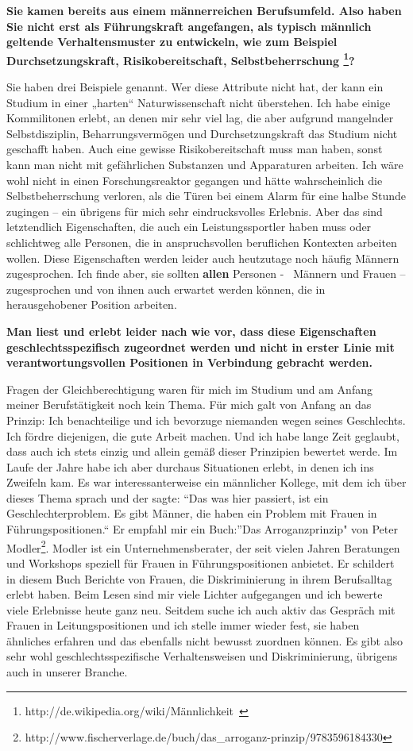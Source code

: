 \documentclass[a4paper,
fontsize=11pt,
oneside,
numbers=noperiodatend,
parskip=half-,
bibliography=totoc,
final
]{scrartcl}
\begin{document}
\textbf{Sie kamen bereits aus einem männerreichen Berufsumfeld. Also
haben Sie nicht erst als Führungskraft angefangen, als typisch männlich
geltende Verhaltensmuster zu entwickeln, wie zum Beispiel
Durchsetzungskraft, Risikobereitschaft, Selbstbeherrschung \footnote{http://de.wikipedia.org/wiki/Männlichkeit~}?~}

Sie haben drei Beispiele genannt. Wer diese Attribute nicht hat, der
kann ein Studium in einer „harten`` Naturwissenschaft nicht überstehen.
Ich habe einige Kommilitonen erlebt, an denen mir sehr viel lag, die
aber aufgrund mangelnder Selbstdisziplin, Beharrungsvermögen und
Durchsetzungskraft das Studium nicht geschafft haben. Auch eine gewisse
Risikobereitschaft muss man haben, sonst kann man nicht mit gefährlichen
Substanzen und Apparaturen arbeiten. Ich wäre wohl nicht in einen
Forschungsreaktor gegangen und hätte wahrscheinlich die
Selbstbeherrschung verloren, als die Türen bei einem Alarm für eine
halbe Stunde zugingen -- ein übrigens für mich sehr eindrucksvolles
Erlebnis. Aber das sind letztendlich Eigenschaften, die auch ein
Leistungssportler haben muss oder schlichtweg alle Personen, die in
anspruchsvollen beruflichen Kontexten arbeiten wollen. Diese
Eigenschaften werden leider auch heutzutage noch häufig Männern
zugesprochen. Ich finde aber, sie sollten \textbf{allen} Personen -~
Männern und Frauen -- zugesprochen und von ihnen auch erwartet werden
können, die in herausgehobener Position arbeiten.~

\textbf{Man liest und erlebt leider nach wie vor, dass diese
Eigenschaften geschlechtsspezifisch zugeordnet werden und nicht in
erster Linie mit verantwortungsvollen Positionen in Verbindung gebracht
werden.~}

Fragen der Gleichberechtigung waren für mich im Studium und am Anfang
meiner Berufstätigkeit noch kein Thema. Für mich galt von Anfang an das
Prinzip: Ich benachteilige und ich bevorzuge niemanden wegen seines
Geschlechts. Ich fördre diejenigen, die gute Arbeit machen. Und ich habe
lange Zeit geglaubt, dass auch ich stets einzig und allein gemäß dieser
Prinzipien bewertet werde. Im Laufe der Jahre habe ich aber durchaus
Situationen erlebt, in denen ich ins Zweifeln kam. Es war
interessanterweise ein männlicher Kollege, mit dem ich über dieses Thema
sprach und der sagte: \enquote{Das was hier passiert, ist ein
Geschlechterproblem. Es gibt Männer, die haben ein Problem mit Frauen in
Führungspositionen.`` Er empfahl mir ein Buch:}Das Arroganzprinzip" von
Peter Modler\footnote{http://www.fischerverlage.de/buch/das\_arroganz-prinzip/9783596184330}.
Modler ist ein Unternehmensberater, der seit vielen Jahren Beratungen
und Workshops speziell für Frauen in Führungspositionen anbietet. Er
schildert in diesem Buch Berichte von Frauen, die Diskriminierung in
ihrem Berufsalltag erlebt haben. Beim Lesen sind mir viele Lichter
aufgegangen und ich bewerte viele Erlebnisse heute ganz neu. Seitdem
suche ich auch aktiv das Gespräch mit Frauen in Leitungspositionen und
ich stelle immer wieder fest, sie haben ähnliches erfahren und das
ebenfalls nicht bewusst zuordnen können. Es gibt also sehr wohl
geschlechtsspezifische Verhaltensweisen und Diskriminierung, übrigens
auch in unserer Branche. ~
\end{document}
